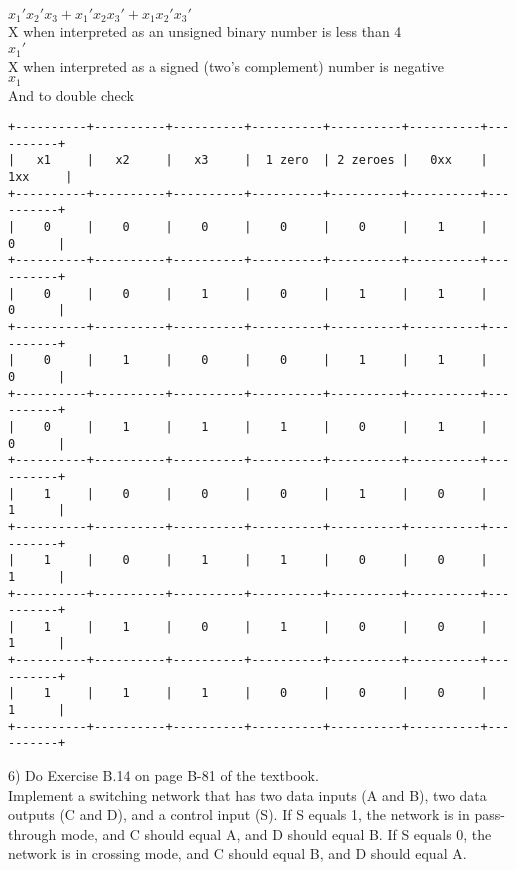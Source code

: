 $x_1'x_2'x_3 + x_1'x_2x_3' + x_1x_2'x_3'$ \\

X when interpreted as an unsigned binary number is less than 4 \\

$x_1'$ \\

X when interpreted as a signed (two's complement) number is negative \\

$x_1$ \\

And to double check \\

\begin{verbatim}
+----------+----------+----------+----------+----------+----------+----------+
|   x1     |   x2     |   x3     |  1 zero  | 2 zeroes |   0xx    |  1xx     |
+----------+----------+----------+----------+----------+----------+----------+
|    0     |    0     |    0     |    0     |    0     |    1     |   0      |
+----------+----------+----------+----------+----------+----------+----------+
|    0     |    0     |    1     |    0     |    1     |    1     |   0      |
+----------+----------+----------+----------+----------+----------+----------+
|    0     |    1     |    0     |    0     |    1     |    1     |   0      |
+----------+----------+----------+----------+----------+----------+----------+
|    0     |    1     |    1     |    1     |    0     |    1     |   0      |
+----------+----------+----------+----------+----------+----------+----------+
|    1     |    0     |    0     |    0     |    1     |    0     |   1      |
+----------+----------+----------+----------+----------+----------+----------+
|    1     |    0     |    1     |    1     |    0     |    0     |   1      |
+----------+----------+----------+----------+----------+----------+----------+
|    1     |    1     |    0     |    1     |    0     |    0     |   1      |
+----------+----------+----------+----------+----------+----------+----------+
|    1     |    1     |    1     |    0     |    0     |    0     |   1      |
+----------+----------+----------+----------+----------+----------+----------+
\end{verbatim}


6) Do Exercise B.14 on page B-81 of the textbook. \\

Implement a switching network that has two data inputs (A and B), two data outputs (C and D), and a control input (S). 
If S equals 1, the network is in pass-through mode, and C should equal A, and D should equal B. 
If S equals 0, the network is in crossing mode, and C should equal B, and D should equal A.




